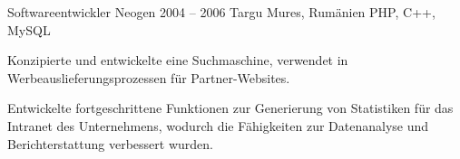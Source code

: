 \cvexperience
  {Softwareentwickler}
  {Neogen}
  {2004 -- 2006}
  {Targu Mures, Rumänien}
  {PHP, C++, MySQL}
  {%
    \item Konzipierte und entwickelte eine Suchmaschine, verwendet in Werbeauslieferungsprozessen für Partner-Websites.
    \item Entwickelte fortgeschrittene Funktionen zur Generierung von Statistiken für das Intranet des Unternehmens, wodurch die Fähigkeiten zur Datenanalyse und Berichterstattung verbessert wurden.
  }
